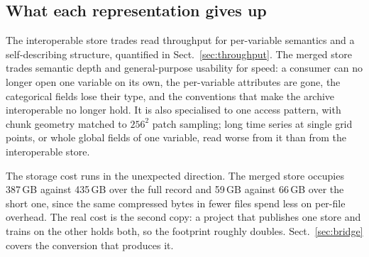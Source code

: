 \documentclass[gmd, manuscript]{copernicus}
\begin{document}
\subsection{What each representation gives up}
\label{sec:gives-up}

The interoperable store trades read throughput for per-variable semantics and a self-describing
structure, quantified in Sect.~\ref{sec:throughput}. The merged store trades semantic depth and
general-purpose usability for speed: a consumer can no longer open one variable on its own,
the per-variable attributes are gone, the categorical fields lose their type, and the
conventions that make the archive interoperable no longer hold. It is also specialised to one
access pattern, with chunk geometry matched to $256^2$ patch sampling; long time series at
single grid points, or whole global fields of one variable, read worse from it than from the
interoperable store.

The storage cost runs in the unexpected direction. The merged store occupies 387\,GB against
435\,GB over the full record and 59\,GB against 66\,GB over the short one, since the same
compressed bytes in fewer files spend less on per-file overhead. The real cost is the second
copy: a project that publishes one store and trains on the other holds both, so the footprint
roughly doubles. Sect.~\ref{sec:bridge} covers the conversion that produces it.
\end{document}
